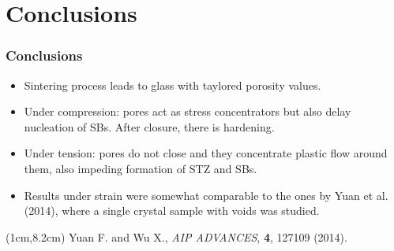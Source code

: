 \documentclass[12pt,t]{beamer}
\begin{document}


\section{Conclusions}

\begin{frame}
    \frametitle{Conclusions}
    \vspace{0.5cm}
    \begin{itemize}
        \item Sintering process leads to glass with taylored porosity values.
        \item Under compression: pores act as stress concentrators but also delay nucleation of SBs. After closure, there is hardening.
        \item Under tension: pores do not close and they concentrate plastic flow around them, also impeding formation of STZ and SBs.
        \item Results under strain were somewhat comparable to the ones by Yuan et al. (2014), where a single crystal sample with voids was studied.
    \end{itemize}
    \begin{textblock*}{12cm}(1cm,8.2cm) %
        \small{Yuan F. and Wu X., \textit{AIP ADVANCES}, \textbf{4}, 127109 (2014).}
    \end{textblock*}
\end{frame}
\end{document}
